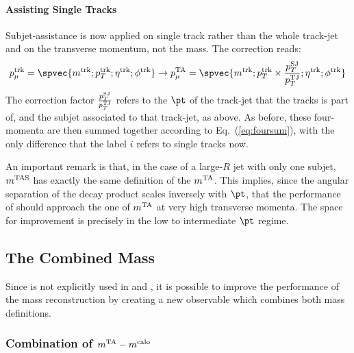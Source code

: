 \paragraph{Assisting Single Tracks}

Subjet-assistance is now applied on single track rather than the whole track-jet and on the transverse momentum, not the mass.
The correction reads:
$$
p_\mu^\textrm{trk} = \spvec{m^\textrm{trk};p_T^\textrm{trk};\eta^\textrm{trk};\phi^\textrm{trk}} \to p_\mu^\textrm{TA}=\spvec{m^\textrm{trk} ;p_T^\textrm{trk} \times\frac{p_T^{\rm SJ}}{p_T^{\rm TJ}};\eta^\textrm{trk};\phi^\textrm{trk}}
$$
The correction factor $\frac{p_T^{\rm SJ}}{p_T^{\rm TJ}}$ refers to the $\pt$ of the track-jet that the tracks is part of, and the subjet associated to that track-jet, as above.
As before, these four-momenta are then summed together according to Eq.~(\ref{eq:foursum}), with the only difference that the label $i$ refers to single tracks now.

An important remark is that, in the case of a large-$R$ jet with only one subjet, $m^\textrm{TAS}$ has exactly the same definition of the $m^\textrm{TA}$. This implies, since the angular separation of the decay product scales inversely with $\pt$, that the performance of \mtas should approach the one of $m^\textrm{TA}$ at very high transverse momenta. The space for improvement is precisely in the low to intermediate $\pt$ regime.




\subsection{The Combined Mass}
\label{subsec:comb}


Since \mcalo is not explicitly used in \mta and \mtas, it is possible to improve the performance of the mass reconstruction by creating a new observable which combines both mass definitions.



\subsubsection{Combination of $m^\textrm{TA}-m^\textrm{calo}$}

